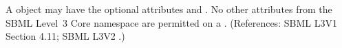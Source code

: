 A \KineticLaw object may have the optional attributes  and
.  No other attributes from the SBML Level~3 Core namespace
are permitted on a \KineticLaw.  (References: SBML L3V1 Section 4.11; SBML L3V2
.)
